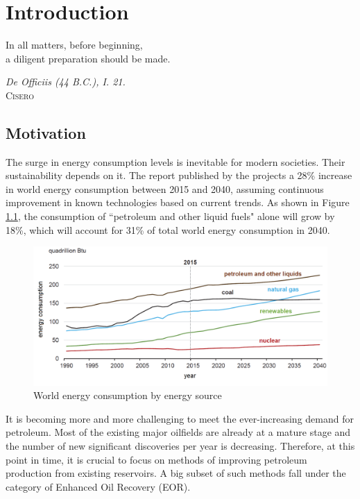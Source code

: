 \chapter{Introduction}
\vspace*{\fill}
\epigraph{In all matters, before beginning,\\ a diligent preparation should be made.}%
{\textit{De Officiis (44 B.C.), I. 21.}\\ \textsc{Cisero}}
\clearpage{\thispagestyle{empty}\cleardoublepage}
\section{Motivation}

The surge in energy consumption levels is inevitable for modern societies. Their sustainability depends on it. The  report \citeyearpar{EIA2017} published by the  projects a 28\% increase in world energy consumption  between 2015 and 2040, assuming continuous improvement in known technologies based on current trends. As shown in Figure \ref{cht:energySources}, the consumption of ``petroleum and other liquid fuels" alone will grow by 18\%, which will account for 31\% of total world energy consumption in 2040.

\begin{figure}[b!]
    \centering
    \includegraphics[width=\textwidth]{img/cht/chtEiaEnergy.png}
    \caption{World energy consumption by energy source \citep{EIA2017}}
    \label{cht:energySources}
\end{figure}

It is becoming more and more challenging to meet the ever-increasing demand for petroleum. Most of the existing major oilfields are already at a mature stage and the number of new significant discoveries per year is decreasing. Therefore, at this point in time, it is crucial to focus on methods of improving petroleum production from existing reservoirs. A big subset of such methods fall under the category of Enhanced Oil Recovery (EOR).

